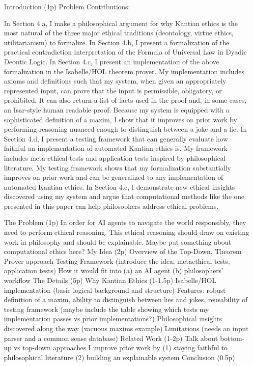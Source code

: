 \documentclass[11pt]{article}
\begin{document}
\begin{outline}[enumerate]
\1 Introduction (1p)
\2 Problem
\2 Contributions:

\3 In Section 4.a, I make a philosophical argument for why Kantian ethics is the most natural of the three major
ethical traditions (deontology, virtue ethics, utilitarianism) to formalize.
\3 In Section 4.b, I present a formalization of the practical contradiction interpretation of the 
Formula of Universal Law in Dyadic Deontic Logic. 
\3 In Section 4.c, I present an implementation of the above formalization in the Isabelle/HOL theorem prover.
My implementation includes axioms and definitions such that my system, when given an appropriately
represented input, can prove that the input is permissible, obligatory, or prohibited. It can also return
a list of facts used in the proof and, in some cases, an Isar-style human readable proof. Because my system
is equipped with a sophisticated definition of a maxim, I show that it improves on prior work by performing 
reasoning nuanced enough to distinguish between a joke and a lie.
\3 In Section 4.d, I present a testing framework that can generally evaluate how faithful an implementation 
of automated Kantian ethics is. My framework includes meta-ethical tests and application tests inspired by philosophical
literature. My testing framework shows that my formalization substantially improves on prior work and can 
be generalized to any implementation of automated Kantian ethics.
\3 In Section 4.e, I demonstrate new ethical insights discovered using my system and argue that 
computational methods like the one presented in this paper can help philosophers address ethical problems.

\1 The Problem (1p)
\2 In order for AI agents to navigate the world responsibly, they need to perform ethical reasoning.
\2 This ethical reasoning should draw on existing work in philosophy and should be explainable.
\2 Maybe put something about computational ethics here?
\1 My Idea (2p)
\2 Overview of the Top-Down, Theorem Prover approach
\2 Testing Framework (introduce the idea, metaethical tests, application tests)
\2 How it would fit into (a) an AI agent (b) philosophers' workflow
\1 The Details (5p)
\2 Why Kantian Ethics (1-1.5p)
\2 Isabelle/HOL implementation (basic logical background and structure)
\2 Features: robust definition of a maxim, ability to distinguish between lies and jokes, reusability of 
testing framework (maybe include the table showing which tests my implementation passes vs prior implementations?)
\2 Philosophical insights discovered along the way (vacuous maxims example)
\2 Limitations (needs an input parser and a common sense database)
\1 Related Work (1-2p)
\2 Talk about bottom-up vs top-down approaches 
\2 I improve prior work by (1) staying faithful to philosophical literature (2) building an explainable
system
\1 Conclusion (0.5p)



\end{outline}
\end{document}
